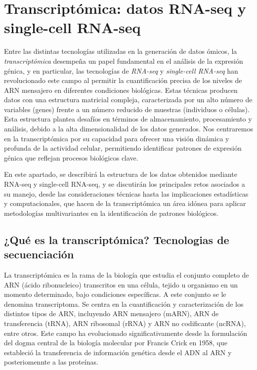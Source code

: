 

\section{Transcriptómica: datos RNA-seq y single-cell RNA-seq}

Entre las distintas tecnologías utilizadas en la generación de datos ómicos, la \textit{transcriptómica} desempeña un papel fundamental en el análisis de la expresión génica, y en particular, las 
tecnologías de \textit{RNA-seq} y \textit{single-cell RNA-seq} han revolucionado este campo al permitir la cuantificación precisa de los 
niveles de ARN mensajero en diferentes condiciones biológicas. Estas técnicas producen datos con una estructura matricial 
compleja, caracterizada por un alto número de variables (genes) frente a un número reducido de muestras (individuos o células). 
Esta estructura plantea desafíos en términos de almacenamiento, procesamiento y análisis, debido a la alta dimensionalidad de 
los datos generados. Nos centraremos en la transcriptómica por su capacidad para ofrecer una visión dinámica 
y profunda de la actividad celular, permitiendo identificar patrones de expresión génica que reflejan procesos biológicos clave. \newline

En este apartado, se describirá la estructura de los datos obtenidos mediante RNA-seq y single-cell RNA-seq, y se discutirán los 
principales retos asociados a su manejo, desde las consideraciones técnicas hasta las implicaciones estadísticas y computacionales, 
que hacen de la transcriptómica un área idónea para aplicar metodologías multivariantes en la identificación de patrones biológicos.

\subsection{¿Qué es la transcriptómica? Tecnologias de secuenciación}

La transcriptómica es la rama de la biología que estudia el conjunto completo de ARN (ácido ribonucleico) transcritos en una
célula, tejido u organismo en un momento determinado, bajo condiciones específicas. A este conjunto se le denomina transcriptoma. Se centra en la cuantificación y caracterización
de los distintos tipos de ARN, incluyendo ARN mensajero (mARN), ARN de transferencia (tRNA), ARN ribosomal (rRNA) y ARN 
no codificante (ncRNA), entre otros. Este campo ha evolucionado significativamente desde la formulación del dogma central de la biología molecular por Francis Crick
en 1958, que estableció la transferencia de información genética desde el ADN al ARN y posteriomennte a las proteínas. \newline

